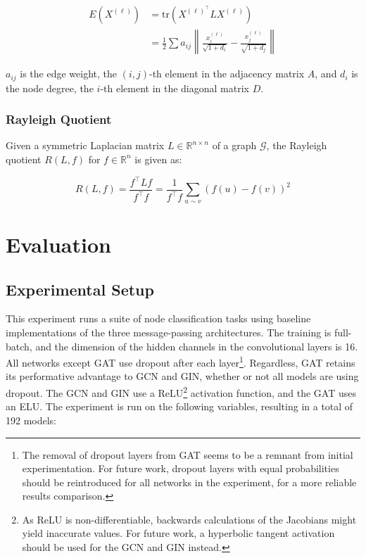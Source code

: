 \documentclass[11pt]{article}
\begin{document}
\begin{equation}
    \begin{aligned}
        E(X^{(\ell)}) &= \text{tr}(X^{(\ell)}^\top L X^{(\ell)}) \\
        & = \frac{1}{2}\sum a_{ij} \left\|  \frac{x_i^{(\ell)}}{\sqrt{1 + d_i}} - \frac{x_j^{(\ell)}}{\sqrt{1 + d_j}} \right\|
    \end{aligned}
\end{equation}

$a_{ij}$ is the edge weight, the $(i,j)$-th element in the adjacency matrix $A$, and $d_i$ is the node degree, the $i$-th element in the diagonal matrix $D$.

\subsubsection{Rayleigh Quotient}

Given a symmetric Laplacian matrix $L \in \mathbb{R}^{n\times n}$ of a graph $\mathcal{G}$, the Rayleigh quotient $R(L, f)$ for $f \in \mathbb{R}^n$ is given as:

\begin{equation}
    R(L, f) = \frac{f^\top Lf}{f^\top f} = \frac{1}{f^\top f}\sum_{u\sim v} (f(u) - f(v))^2
\end{equation}

\section{Evaluation} 

\subsection{Experimental Setup}

This experiment runs a suite of node classification tasks using baseline implementations of the three message-passing architectures. The training is full-batch, and the dimension of the hidden channels in the convolutional layers is 16. All networks except GAT use dropout after each layer\footnote{The removal of dropout layers from GAT seems to be a remnant from initial experimentation. For future work, dropout layers with equal probabilities should be reintroduced for all networks in the experiment, for a more reliable results comparison.}. Regardless, GAT retains its performative advantage to GCN and GIN, whether or not all models are using dropout. The GCN and GIN use a ReLU\footnote{As ReLU is non-differentiable, backwards calculations of the Jacobians might yield inaccurate values. For future work, a hyperbolic tangent activation should be used for the GCN and GIN instead.} activation function, and the GAT uses an ELU. The experiment is run on the following variables, resulting in a total of 192 models:
\end{document}
